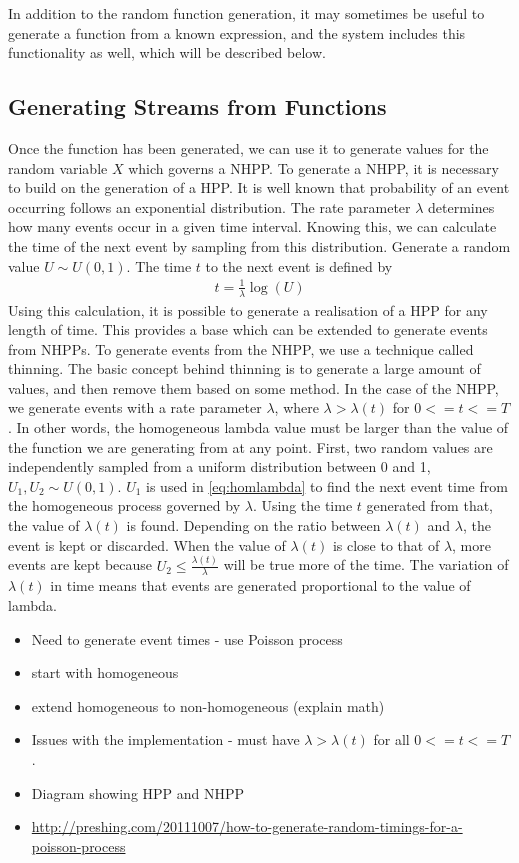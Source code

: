 \documentclass[a4paper,11pt]{article}
\begin{document}
In addition to the random function generation, it may sometimes be useful to
generate a function from a known expression, and the system includes this
functionality as well, which will be described below.
\subsection{Generating Streams from Functions}
\label{sec-4-2}

   Once the function has been generated, we can use it to generate values for
   the random variable $X$ which governs a NHPP. To generate a NHPP, it is
   necessary to build on the generation of a HPP. It is well known that
   probability of an event occurring follows an exponential distribution. The
   rate parameter $\lambda$ determines how many events occur in a given time
   interval. Knowing this, we can calculate the time of the next event by
   sampling from this distribution. Generate a random value $U\sim U(0,1)$. The
   time $t$ to the next event is defined by
   \begin{align}\label{eq:homlambda}
   t=\frac{1}{\lambda}\log(U)
   \end{align}
   Using this calculation, it is possible to generate a realisation of a HPP for
   any length of time. This provides a base which can be extended to generate
   events from NHPPs. To generate events from the NHPP, we use a technique
   called thinning. The basic concept behind thinning is to generate a large
   amount of values, and then remove them based on some method. In the case of
   the NHPP, we generate events with a rate parameter $\lambda$, where
   $\lambda>\lambda(t)$ for $0<=t<=T$. In other words, the homogeneous lambda
   value must be larger than the value of the function we are generating from at
   any point. First, two random values are independently sampled from a uniform
   distribution between 0 and 1, $U_1,U_2\sim U(0,1)$. $U_1$ is used in
   \eqref{eq:homlambda} to find the next event time from the homogeneous process
   governed by $\lambda$. Using the time $t$ generated from that, the value of
   $\lambda(t)$ is found. Depending on the ratio between $\lambda(t)$ and
   $\lambda$, the event is kept or discarded. When the value of $\lambda(t)$ is
   close to that of $\lambda$, more events are kept because
   $U_2\leq\frac{\lambda(t)}{\lambda}$ will be true more of the time. The
   variation of $\lambda(t)$ in time means that events are generated
   proportional to the value of lambda.

\begin{itemize}
\item Need to generate event times - use Poisson process
\item start with homogeneous
\item extend homogeneous to non-homogeneous (explain math)
\item Issues with the implementation - must have $\lambda>\lambda(t)$ for all
  $0<=t<=T$.
\item Diagram showing HPP and NHPP
\item \href{http://preshing.com/20111007/how-to-generate-random-timings-for-a-poisson-process}{http://preshing.com/20111007/how-to-generate-random-timings-for-a-poisson-process}
\end{itemize}
\end{document}
